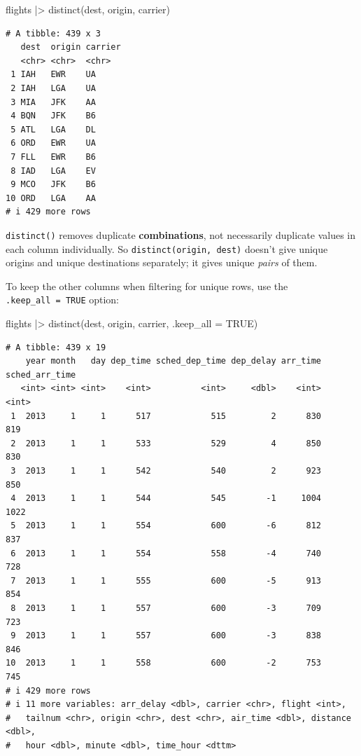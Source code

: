 \documentclass[
  letterpaper,
  DIV=11,
  numbers=noendperiod]{scrreprt}
\newenvironment{Shaded}{\begin{snugshade}}{\end{snugshade}}
\newcommand{\AttributeTok}[1]{\textcolor[rgb]{0.40,0.45,0.13}{#1}}
\newcommand{\ConstantTok}[1]{\textcolor[rgb]{0.56,0.35,0.01}{#1}}
\newcommand{\FunctionTok}[1]{\textcolor[rgb]{0.28,0.35,0.67}{#1}}
\newcommand{\NormalTok}[1]{\textcolor[rgb]{0.00,0.23,0.31}{#1}}
\newcommand{\SpecialCharTok}[1]{\textcolor[rgb]{0.37,0.37,0.37}{#1}}
\begin{document}
\begin{Shaded}
\begin{Highlighting}[]
\NormalTok{flights }\SpecialCharTok{|\textgreater{}}
  \FunctionTok{distinct}\NormalTok{(dest, origin, carrier)}
\end{Highlighting}
\end{Shaded}

\begin{verbatim}
# A tibble: 439 x 3
   dest  origin carrier
   <chr> <chr>  <chr>  
 1 IAH   EWR    UA     
 2 IAH   LGA    UA     
 3 MIA   JFK    AA     
 4 BQN   JFK    B6     
 5 ATL   LGA    DL     
 6 ORD   EWR    UA     
 7 FLL   EWR    B6     
 8 IAD   LGA    EV     
 9 MCO   JFK    B6     
10 ORD   LGA    AA     
# i 429 more rows
\end{verbatim}

\texttt{distinct()} removes duplicate \textbf{combinations}, not
necessarily duplicate values in each column individually. So
\texttt{distinct(origin,\ dest)} doesn't give unique origins and unique
destinations separately; it gives unique \emph{pairs} of them.

To keep the other columns when filtering for unique rows, use the
\texttt{.keep\_all\ =\ TRUE} option:

\begin{Shaded}
\begin{Highlighting}[]
\NormalTok{flights }\SpecialCharTok{|\textgreater{}}
  \FunctionTok{distinct}\NormalTok{(dest, origin, carrier, }\AttributeTok{.keep\_all =} \ConstantTok{TRUE}\NormalTok{)}
\end{Highlighting}
\end{Shaded}

\begin{verbatim}
# A tibble: 439 x 19
    year month   day dep_time sched_dep_time dep_delay arr_time sched_arr_time
   <int> <int> <int>    <int>          <int>     <dbl>    <int>          <int>
 1  2013     1     1      517            515         2      830            819
 2  2013     1     1      533            529         4      850            830
 3  2013     1     1      542            540         2      923            850
 4  2013     1     1      544            545        -1     1004           1022
 5  2013     1     1      554            600        -6      812            837
 6  2013     1     1      554            558        -4      740            728
 7  2013     1     1      555            600        -5      913            854
 8  2013     1     1      557            600        -3      709            723
 9  2013     1     1      557            600        -3      838            846
10  2013     1     1      558            600        -2      753            745
# i 429 more rows
# i 11 more variables: arr_delay <dbl>, carrier <chr>, flight <int>,
#   tailnum <chr>, origin <chr>, dest <chr>, air_time <dbl>, distance <dbl>,
#   hour <dbl>, minute <dbl>, time_hour <dttm>
\end{verbatim}
\end{document}

